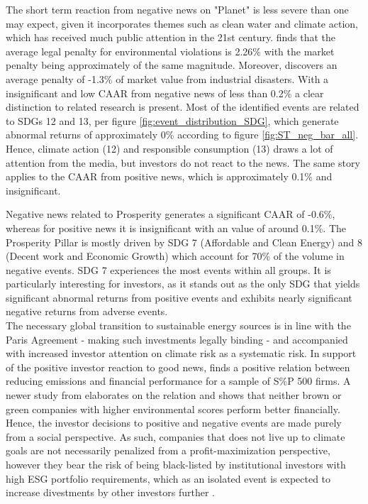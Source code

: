 The short term reaction from negative news on "Planet" is less severe than one may expect, given it incorporates themes such as clean water and climate action, which has received much public attention in the 21st century. \cite{karpoff2005reputational} finds that the average legal penalty for environmental violations is 2.26\% with the market penalty being approximately of the same magnitude. Moreover, \cite{capelle2010does} discovers an average penalty of -1.3\% of market value from industrial disasters. With a insignificant and low CAAR from negative news of less than 0.2\% a clear distinction to related research is present. Most of the identified events are related to SDGs 12 and 13, per figure \ref{fig:event_distribution_SDG}, which generate abnormal returns of approximately 0\% according to figure \ref{fig:ST_neg_bar_all}. Hence, climate action (12) and responsible consumption (13) draws a lot of attention from the media, but investors do not react to the news. The same story applies to the CAAR from positive news, which is approximately 0.1\% and insignificant. 

Negative news related to Prosperity generates a significant CAAR of -0.6\%, whereas for positive news it is insignificant with an value of around 0.1\%. The Prosperity Pillar is mostly driven by SDG 7 (Affordable and Clean Energy) and 8 (Decent work and Economic Growth) which account for 70\% of the volume in negative events. SDG 7 experiences the most events within all groups. It is particularly interesting for investors, as it stands out as the only SDG that yields significant abnormal returns from positive events and exhibits nearly significant negative returns from adverse events.\\
The necessary global transition to sustainable energy sources is in line with the Paris Agreement - making such investments legally binding - and accompanied with increased investor attention on climate risk as a systematic risk. In support of the positive investor reaction to good news, \cite{hart1996does} finds a positive relation between reducing emissions and financial performance for a sample of S\%P 500 firms. A newer study from \cite{paytobegreen} elaborates on the relation and shows that neither brown or green companies with higher environmental scores perform better financially. Hence, the investor decisions to positive and negative events are made purely from a social perspective. As such, companies that does not live up to climate goals are not necessarily penalized from a profit-maximization perspective, however they bear the risk of being black-listed by institutional investors with high ESG portfolio requirements, which as an isolated event is expected to increase divestments by other investors further \cite{dell2021norwegian}. 

